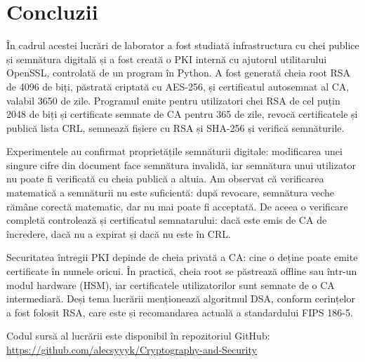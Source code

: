 \documentclass[12pt,a4paper]{article}
\begin{document}
\section{Concluzii}

În cadrul acestei lucrări de laborator a fost studiată infrastructura cu chei
publice și semnătura digitală și a fost creată o PKI internă cu ajutorul
utilitarului OpenSSL, controlată de un program în Python. A fost generată cheia
root RSA de 4096 de biți, păstrată criptată cu AES-256, și certificatul
autosemnat al CA, valabil 3650 de zile. Programul emite pentru utilizatori chei
RSA de cel puțin 2048 de biți și certificate semnate de CA pentru 365 de zile,
revocă certificatele și publică lista CRL, semnează fișiere cu RSA și SHA-256 și
verifică semnăturile.

Experimentele au confirmat proprietățile semnăturii digitale: modificarea unei
singure cifre din document face semnătura invalidă, iar semnătura unui
utilizator nu poate fi verificată cu cheia publică a altuia. Am observat că
verificarea matematică a semnăturii nu este suficientă: după revocare, semnătura
veche rămâne corectă matematic, dar nu mai poate fi acceptată. De aceea o
verificare completă controlează și certificatul semnatarului: dacă este emis de
CA de încredere, dacă nu a expirat și dacă nu este în CRL.

Securitatea întregii PKI depinde de cheia privată a CA: cine o deține poate
emite certificate în numele oricui. În practică, cheia root se păstrează offline
sau într-un modul hardware (HSM), iar certificatele utilizatorilor sunt semnate
de o CA intermediară. Deși tema lucrării menționează algoritmul DSA, conform
cerințelor a fost folosit RSA, care este și recomandarea actuală a standardului
FIPS 186-5.

Codul sursă al lucrării este disponibil în repozitoriul GitHub:\\
\url{https://github.com/alecsyyyk/Cryptography-and-Security}
\end{document}
